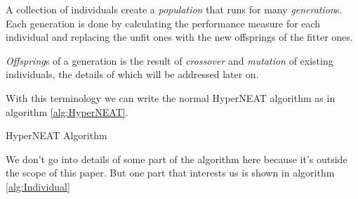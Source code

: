 \documentclass[twocolumn]{article}
\begin{document}
A collection of individuals create a \textit{population} that runs for many \textit{generation}s. Each generation is done by calculating the performance measure for each individual and replacing the unfit ones with the new offsprings of the fitter ones.

\textit{Offspring}s of a generation is the result of \textit{crossover} and \textit{mutation} of existing individuals, the details of which will be addressed later on.

With this terminology we can write the normal HyperNEAT algorithm as in algorithm \ref{alg:HyperNEAT}.

\begin{algorithm}
    \caption{HyperNEAT Algorithm}
    \label{alg:HyperNEAT}
    \begin{algorithmic}[1]
                    \EndFor
                \EndFor
            \EndFor
            \State {}
        \EndProcedure
    \end{algorithmic}
\end{algorithm}

We don't go into details of some part of the algorithm here because it's outside the scope of this paper. But one part that interests us is shown in algorithm \ref{alg:Individual}
\end{document}
